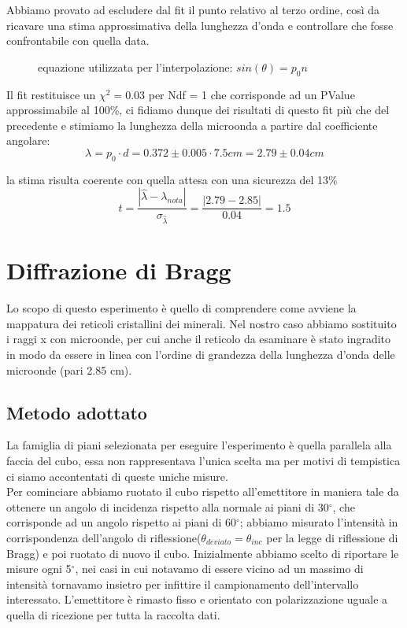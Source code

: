 \documentclass{article}
\theoremstyle{definition}
\begin{document}
\noindent Abbiamo provato ad escludere dal fit il punto relativo al terzo ordine, così da ricavare una stima approssimativa della lunghezza d'onda e controllare che fosse confrontabile con quella data.\\

\begin{figure}[!htbp]
    	\captionsetup{labelformat=empty}

	\caption{equazione utilizzata per l'interpolazione: \(sin(\theta) = p_{0}n\)}
\end{figure}

Il fit restituisce un \(\chi^{2} = 0.03\) per Ndf = 1 che corrisponde ad un PValue approssimabile al 100\%, ci fidiamo dunque dei risultati di questo fit più che del precedente e stimiamo la lunghezza della microonda a partire dal coefficiente angolare:
\[\lambda = p_{0} \cdot d = 0.372 \pm 0.005 \cdot 7.5 cm = 2.79 \pm 0.04 cm \]

la stima risulta coerente con quella attesa con una sicurezza del 13\% 
\[t = \frac{\left| \hat{\lambda} - \lambda_{nota}\right|}{\sigma_{\hat{\lambda}}} = \frac{\left| 2.79 - 2.85 \right|}{0.04} = 1.5\]





\section{Diffrazione di Bragg}
Lo scopo di questo esperimento è quello di comprendere come avviene la mappatura dei reticoli cristallini dei minerali.
Nel nostro caso abbiamo sostituito i raggi x con microonde, per cui anche il reticolo da esaminare è stato ingradito in modo da essere in linea con l'ordine di grandezza della lunghezza d'onda delle microonde (pari 2.85 cm).

\subsection{Metodo adottato}
La famiglia di piani selezionata per eseguire l'esperimento è quella parallela alla faccia del cubo, essa non rappresentava l'unica scelta ma per motivi di tempistica ci siamo accontentati di queste uniche misure.\\
Per cominciare abbiamo ruotato il cubo rispetto all'emettitore in maniera tale da ottenere un angolo di incidenza rispetto alla normale ai piani di 30\(^{\circ}\), che corrisponde ad un angolo rispetto ai piani di 60\(^{\circ}\); abbiamo misurato l'intensità in corrispondenza dell'angolo di riflessione(\(\theta_{deviato} = \theta_{inc}\) per la legge di riflessione di Bragg) e poi ruotato di nuovo il cubo. Inizialmente abbiamo scelto di riportare le misure ogni 5\(^{\circ}\), nei casi in cui notavamo di essere vicino ad un massimo di intensità tornavamo insietro per infittire il campionamento dell'intervallo interessato. L'emettitore è rimasto fisso e orientato con polarizzazione uguale a quella di ricezione per tutta la raccolta dati.\\
\end{document}
